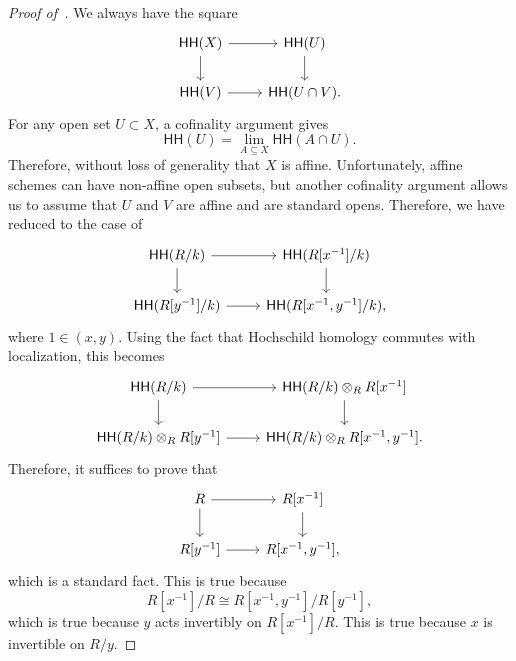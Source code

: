 \documentclass[10pt]{amsart}
\theoremstyle{definition}
\theoremstyle{remark}
\theoremstyle{plain}
\theoremstyle{definition}
\theoremstyle{remark}
\newcommand{\ms}[1]{\mathsf{#1}}
\newcommand{\1}{\mathbf{1}}
\newcommand{\2}{\mathbf{2}}
\newcommand{\3}{\mathbf{3}}
\newcommand{\HH}{\ms{HH}}
\begin{document}
\begin{proof}[Proof of~]
    We always have the square
    \begin{equation*}
        \begin{tikzcd}
            \HH(X) \ar{r} \ar{d} & \HH(U) \ar{d} \\
            \HH(V) \ar{r} & \HH(U \cap V).
        \end{tikzcd}
        \end{equation*}
        For any open set $U \subset X$, a cofinality argument gives
        \[ \HH(U) = \lim_{A \subseteq X} \HH(A \cap U). \]
        Therefore, without loss of generality that $X$ is affine. Unfortunately, affine schemes can have non-affine open subsets, but another cofinality argument allows us to assume that $U$ and $V$ are affine and are standard opens. Therefore, we have reduced to the case of
        \begin{equation*}
        \begin{tikzcd}
            \HH(R/k) \ar{r} \ar{d} & \HH(R[x^{-1}]/k) \ar{d} \\
            \HH(R[y^{-1}]/k) \ar{r} & \HH(R[x^{-1}, y^{-1}]/k),
        \end{tikzcd}
        \end{equation*}
        where $1 \in (x,y)$. Using the fact that Hochschild homology commutes with localization, this becomes
        \begin{equation*}
            \begin{tikzcd}
                \HH(R/k) \ar{r} \ar{d} & \HH(R/k) \otimes_R R[x^{-1}] \ar{d} \\
                \HH(R/k) \otimes_R R[y^{-1}] \ar{r} & \HH(R/k) \otimes_R R[x^{-1}, y^{-1}].
            \end{tikzcd}
        \end{equation*}
        Therefore, it suffices to prove that
        \begin{equation*}
        \begin{tikzcd}
            R \ar{r} \ar{d} & R[x^{-1}] \ar{d} \\
            R[y^{-1}] \ar{r} & R[x^{-1}, y^{-1}],
        \end{tikzcd}
        \end{equation*}
        which is a standard fact. This is true because
        \[ R[x^{-1}]/R \cong R[x^{-1}, y^{-1}]/ R[y^{-1}], \]
        which is true because $y$ acts invertibly on $R[x^{-1}]/R$. This is true because $x$ is invertible on $R/y$.
\end{proof}
\end{document}
